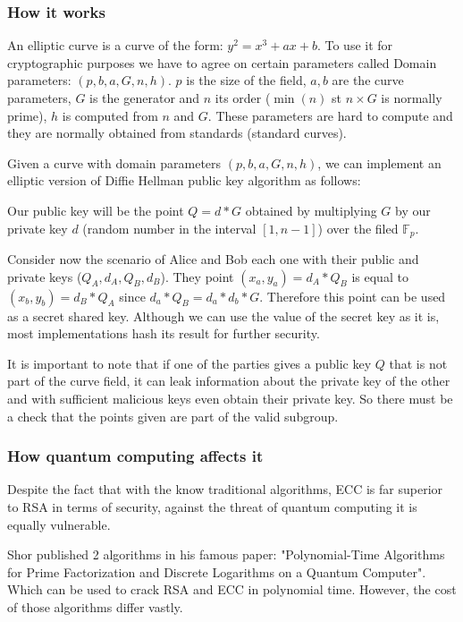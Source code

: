 \subsubsection{How it works}

An elliptic curve is a curve of the form: $y^2 = x^3 + ax + b$. To use it for
cryptographic purposes we have to agree on certain parameters called Domain
parameters: $(p,b,a,G,n,h)$. $p$ is the size of the field, $a,b$ are the curve
parameters, $G$ is the generator and $n$ its order ($\min(n)$ st $ n \times G$
is normally prime), $h$ is computed from $n$ and $G$. These parameters are hard
to compute and they are normally obtained from standards (standard curves).

Given a curve with domain parameters $(p,b,a,G,n,h)$, we can implement an
elliptic version of Diffie Hellman public key algorithm as follows:

Our public key will be the point $Q = d * G$ obtained by multiplying $G$ by our
private key $d$ (random number in the interval $[1, n-1]$) over the filed
$\mathds{F}_p$.

Consider now the scenario of Alice and Bob each one with their public and
private keys ($Q_A, d_A, Q_B, d_B$). They point $(x_a, y_a) = d_A * Q_B$ is
equal to $(x_b, y_b) = d_B * Q_A$ since $d_a * Q_B = d_a * d_b * G$. Therefore
this point can be used as a secret shared key. Although we can use the value of
the secret key as it is, most implementations hash its result for further
security.

It is important to note that if one of the parties gives a public key $Q$ that
is not part of the curve field, it can leak information about the private key of
the other and with sufficient malicious keys even obtain their private key. So
there must be a check that the points given are part of the valid subgroup.
\cite{pernul_practical_2015}


\subsubsection{How quantum computing affects it}

Despite the fact that with the know traditional algorithms, ECC is far superior
to RSA in terms of security, against the threat of quantum computing it is
equally vulnerable.

Shor published 2 algorithms in his famous paper: "Polynomial-Time Algorithms for
Prime Factorization and Discrete Logarithms on a Quantum Computer".
\cite{shor_polynomial-time_1997} Which can be
used to crack RSA and ECC in polynomial time. However, the cost of those
algorithms differ vastly.

